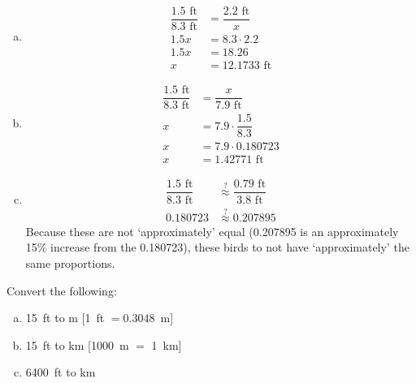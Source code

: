 \documentclass[11pt,letterpaper]{article}
\begin{document}
\sol
\begin{enumerate}[(a)]
\item 
	\[
	\begin{aligned}
	\dfrac{1.5 \text{ ft}}{8.3 \text{ ft}}&= \dfrac{2.2 \text{ ft}}{x} \\[0.3cm]
	1.5x&= 8.3 \cdot 2.2 \\[0.3cm]
	1.5x&= 18.26 \\[0.3cm]
	x&= 12.1733 \text{ ft}
	\end{aligned}
	\] \pspace

\item 
	\[
	\begin{aligned}
	\dfrac{1.5 \text{ ft}}{8.3 \text{ ft}}&= \dfrac{x}{7.9 \text{ ft}} \\[0.3cm]
	x&= 7.9 \cdot \dfrac{1.5}{8.3} \\[0.3cm]
	x&= 7.9 \cdot 0.180723 \\[0.3cm]
	x&= 1.42771 \text{ ft}
	\end{aligned}
	\] \pspace
 
\item 
	\[
	\begin{aligned}
	\dfrac{1.5 \text{ ft}}{8.3 \text{ ft}} &\stackrel{?}{\approx} \dfrac{0.79 \text{ ft}}{3.8 \text{ ft}} \\[0.3cm]
	0.180723 &\stackrel{?}{\approx} 0.207895
	\end{aligned}
	\] 
Because these are not `approximately' equal (0.207895 is an approximately 15\% increase from the 0.180723), these birds to not have `approximately' the same proportions. 
\end{enumerate}



\newpage



 Convert the following:
\begin{enumerate}[(a)]
\item 15~ft to m [1~ft $= 0.3048$~m]
\item 15~ft to km [1000~m $=$ 1~km]
\item 6400~ft to km
\end{enumerate} \pspace
\end{document}
